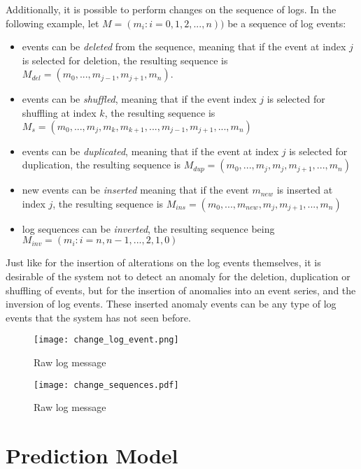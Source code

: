 Additionally, it is possible to perform changes on the sequence of logs. In the following example, let $M = (m_i : i = 0, 1, 2, ..., n))$ be a sequence of log events:
\begin{itemize}
	\setlength\itemsep{-0.5em}
	\item events can be \textit{deleted} from the sequence, meaning that if the event at index $j$ is selected for deletion, the resulting sequence is $M_{del} = (m_0, ..., m_{j-1}, m_{j+1}, m_n)$.
	\item events can be \textit{shuffled}, meaning that if the event index $j$ is selected for shuffling at index $k$, the resulting sequence is $M_s = (m_0, ..., m_j, m_k, m_{k+1}, ..., m_{j-1}, m_{j+1}, ..., m_n)$
	\item events can be \textit{duplicated}, meaning that if the event at index $j$ is selected for duplication, the resulting sequence is $M_{dup} = (m_0, ..., m_j, m_j, m_{j+1}, ..., m_n)$
	\item new events can be \textit{inserted} meaning that if the event $m_{new}$ is inserted at index $j$, the resulting sequence is $M_{ins} = (m_0, ..., m_{new}, m_j, m_{j+1}, ..., m_n)$
	\item log sequences can be \textit{inverted}, the resulting sequence being $M_{inv} = (m_i : i = n, n-1, ..., 2, 1, 0)$
\end{itemize}

Just like for the insertion of alterations on the log events themselves, it is desirable of the system not to detect an anomaly for the deletion, duplication or shuffling of events, but for the insertion of anomalies into an event series, and the inversion of log events. These inserted anomaly events can be any type of log events that the system has not seen before.


\begin{figure}[H]
	\centering
	\texttt{[image: change\_log\_event.png]}
	\caption{Raw log message}
	\label{fig:changelogevent}
\end{figure}

\begin{figure}[H]
	\centering
	\texttt{[image: change\_sequences.pdf]}
	\caption{Raw log message}
	\label{fig:changesequence}
\end{figure}




\section{Prediction Model\label{sec:prediction_model}}

